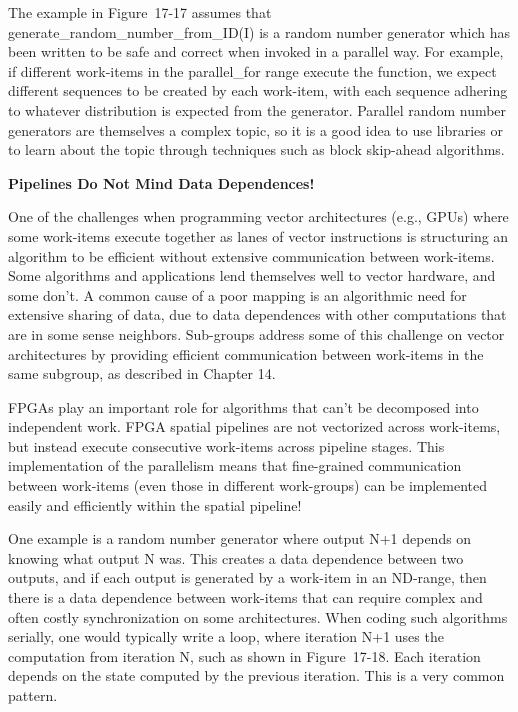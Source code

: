 \begin{tcolorbox}[colback=blue!5!white,colframe=blue!75!black, title=PARALLEL RANDOM NUMBER GENERATORS]
The example in Figure 17-17 assumes that generate\_random\_number\_from\_ID(I) is a random number generator which has been written to be safe and correct when invoked in a parallel way. For example, if different work-items in the parallel\_for range execute the function, we expect different sequences to be created by each work-item, with each sequence adhering to whatever distribution is expected from the generator. Parallel random number generators are themselves a complex topic, so it is a good idea to use libraries or to learn about the topic through techniques such as block skip-ahead algorithms.
\end{tcolorbox}

\hspace*{\fill} \par %
\textbf{Pipelines Do Not Mind Data Dependences!}

One of the challenges when programming vector architectures (e.g., GPUs) where some work-items execute together as lanes of vector instructions is structuring an algorithm to be efficient without extensive communication between work-items. Some algorithms and applications lend themselves well to vector hardware, and some don’t. A common cause of a poor mapping is an algorithmic need for extensive sharing of data, due to data dependences with other computations that are in some sense neighbors. Sub-groups address some of this challenge on vector architectures by providing efficient communication between work-items in the same subgroup, as described in Chapter 14.\par

FPGAs play an important role for algorithms that can’t be decomposed into independent work. FPGA spatial pipelines are not vectorized across work-items, but instead execute consecutive work-items across pipeline stages. This implementation of the parallelism means that fine-grained communication between work-items (even those in different work-groups) can be implemented easily and efficiently within the spatial pipeline!\par

One example is a random number generator where output N+1 depends on knowing what output N was. This creates a data dependence between two outputs, and if each output is generated by a work-item in an ND-range, then there is a data dependence between work-items that can require complex and often costly synchronization on some architectures. When coding such algorithms serially, one would typically write a loop, where iteration N+1 uses the computation from iteration N, such as shown in Figure 17-18. Each iteration depends on the state computed by the previous iteration. This is a very common pattern.\par


